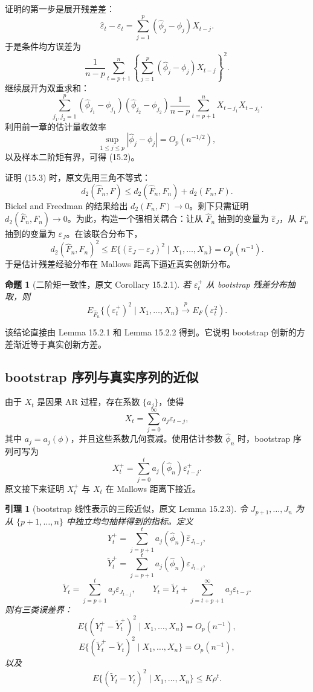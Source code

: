 \documentclass[11pt,a4paper]{ctexart}
\newtheorem{lemma}{引理}[section]
\newtheorem{proposition}{命题}[section]
\begin{document}
证明的第一步是展开残差差：
\[
  \hat\varepsilon_t-\varepsilon_t
  =\sum_{j=1}^p(\hat\phi_j-\phi_j)X_{t-j}.
\]
于是条件均方误差为
\[
  \frac1{n-p}\sum_{t=p+1}^n
  \left\{\sum_{j=1}^p(\hat\phi_j-\phi_j)X_{t-j}\right\}^2.
\]
继续展开为双重求和：
\[
  \sum_{j_1,j_2=1}^p(\hat\phi_{j_1}-\phi_{j_1})
  (\hat\phi_{j_2}-\phi_{j_2})
  \frac1{n-p}\sum_{t=p+1}^nX_{t-j_1}X_{t-j_2}.
\]
利用前一章的估计量收敛率
\[
  \sup_{1\le j\le p}|\hat\phi_j-\phi_j|=O_p(n^{-1/2}),
\]
以及样本二阶矩有界，可得 (15.2)。

证明 (15.3) 时，原文先用三角不等式：
\[
  d_2(\hat F_n,F)\le d_2(\hat F_n,F_n)+d_2(F_n,F).
\]
Bickel and Freedman 的结果给出 \(d_2(F_n,F)\to0\)。剩下只需证明 \(d_2(\hat F_n,F_n)\to0\)。为此，构造一个强相关耦合：让从 \(\hat F_n\) 抽到的变量为 \(\hat\varepsilon_J\)，从 \(F_n\) 抽到的变量为 \(\varepsilon_J\)。在该联合分布下，
\[
  d_2(\hat F_n,F_n)^2
  \le E\{(\hat\varepsilon_J-\varepsilon_J)^2\mid X_1,\ldots,X_n\}
  =O_p(n^{-1}).
\]
于是估计残差经验分布在 Mallows 距离下逼近真实创新分布。

\begin{proposition}[二阶矩一致性，原文 Corollary 15.2.1]
若 \(\varepsilon_t^+\) 从 bootstrap 残差分布抽取，则
\[
  E_{\hat F_n}\{(\varepsilon_t^+)^2\mid X_1,\ldots,X_n\}
  \xrightarrow{p} E_F(\varepsilon_t^2).
\]
\end{proposition}

该结论直接由 Lemma 15.2.1 和 Lemma 15.2.2 得到。它说明 bootstrap 创新的方差渐近等于真实创新方差。

\subsection{bootstrap 序列与真实序列的近似}

由于 \(X_t\) 是因果 AR 过程，存在系数 \(\{a_j\}\)，使得
\[
  X_t=\sum_{j=0}^{\infty}a_j\varepsilon_{t-j},
\]
其中 \(a_j=a_j(\phi)\)，并且这些系数几何衰减。使用估计参数 \(\hat\phi_n\) 时，bootstrap 序列可写为
\[
  X_t^+=\sum_{j=0}^{t}a_j(\hat\phi_n)\varepsilon_{t-j}^+.
\]
原文接下来证明 \(X_t^+\) 与 \(X_t\) 在 Mallows 距离下接近。

\begin{lemma}[bootstrap 线性表示的三段近似，原文 Lemma 15.2.3]
令 \(J_{p+1},\ldots,J_n\) 为从 \(\{p+1,\ldots,n\}\) 中独立均匀抽样得到的指标。定义
\[
  Y_t^+=\sum_{j=p+1}^t a_j(\hat\phi_n)\hat\varepsilon_{J_{t-j}},
\]
\[
  \widetilde Y_t^+=\sum_{j=p+1}^t a_j(\hat\phi_n)\varepsilon_{J_{t-j}},
\]
\[
  \widetilde Y_t=\sum_{j=p+1}^t a_j\varepsilon_{J_{t-j}},
  \qquad
  Y_t=\widetilde Y_t+\sum_{j=t+p+1}^{\infty}a_j\varepsilon_{t-j}.
\]
则有三类误差界：
\[
  E\{(Y_t^+-\widetilde Y_t^+)^2\mid X_1,\ldots,X_n\}=O_p(n^{-1}),
  \tag{15.4}
\]
\[
  E\{(\widetilde Y_t^+-\widetilde Y_t)^2\mid X_1,\ldots,X_n\}=O_p(n^{-1}),
  \tag{15.5}
\]
以及
\[
  E\{(\widetilde Y_t-Y_t)^2\mid X_1,\ldots,X_n\}\le K\rho^t.
  \tag{15.6}
\]
\end{lemma}
\end{document}
